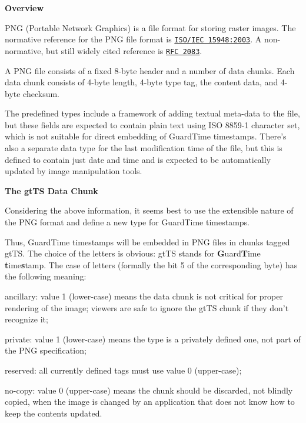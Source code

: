 {\bfseries Overview}

PNG (Portable Network Graphics) is a file format for storing raster images. The normative reference for the PNG file format is \href{http://www.w3.org/TR/PNG/}{\tt ISO/IEC 15948:2003}. A non-\/normative, but still widely cited reference is \href{http://www.ietf.org/rfc/rfc2083.txt}{\tt RFC 2083}.

A PNG file consists of a fixed 8-\/byte header and a number of data chunks. Each data chunk consists of 4-\/byte length, 4-\/byte type tag, the content data, and 4-\/byte checksum.

The predefined types include a framework of adding textual meta-\/data to the file, but these fields are expected to contain plain text using ISO 8859-\/1 character set, which is not suitable for direct embedding of GuardTime timestamps. There's also a separate data type for the last modification time of the file, but this is defined to contain just date and time and is expected to be automatically updated by image manipulation tools.

{\bfseries The {\ttfamily gtTS} Data Chunk}

Considering the above information, it seems best to use the extensible nature of the PNG format and define a new type for GuardTime timestamps.

Thus, GuardTime timestamps will be embedded in PNG files in chunks tagged {\ttfamily gtTS}. The choice of the letters is obvious: {\ttfamily gtTS} stands for {\bfseries G}uard{\bfseries T}ime {\bfseries t}ime{\bfseries s}tamp. The case of letters (formally the bit 5 of the corresponding byte) has the following meaning:
\begin{DoxyEnumerate}
\item ancillary: value 1 (lower-\/case) means the data chunk is not critical for proper rendering of the image; viewers are safe to ignore the {\ttfamily gtTS} chunk if they don't recognize it;
\item private: value 1 (lower-\/case) means the type is a privately defined one, not part of the PNG specification;
\item reserved: all currently defined tags must use value 0 (upper-\/case);
\item no-\/copy: value 0 (upper-\/case) means the chunk should be discarded, not blindly copied, when the image is changed by an application that does not know how to keep the contents updated.
\end{DoxyEnumerate}

